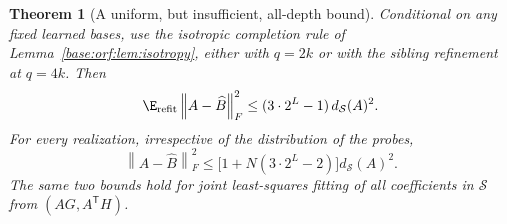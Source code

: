 \documentclass[11pt,oneside,openany,a4paper]{book}
\numberwithin{equation}{chapter}
\newtheorem{theorem}{Theorem}[chapter]
\theoremstyle{definition}
\theoremstyle{remark}
\newcommand{\T}{\mathsf T}\newcommand{\Id}{I}
\newcommand{\F}[1]{\left\lVert#1\right\rVert_F}
\begin{document}
\begin{theorem}[A uniform, but insufficient, all-depth bound]\label{base:orf:thm:bound}
Conditional on any fixed learned bases, use the isotropic completion rule
of Lemma~\ref{base:orf:lem:isotropy}, either with $q=2k$ or with the sibling refinement
at $q=4k$. Then
\begin{equation}\label{base:orf:eq:mainbound}
 \E_{\rm refit}\F{A-\widehat B}^2
 \le(3\cdot2^L-1)\,d_{\mathcal S}(A)^2.
\end{equation}
For every realization, irrespective of the distribution of the probes,
\begin{equation}\label{base:orf:eq:pathbound}
 \F{A-\widehat B}^2
 \le\bigl[1+N(3\cdot2^L-2)\bigr]d_{\mathcal S}(A)^2.
\end{equation}
The same two bounds hold for joint least-squares fitting of all coefficients
in $\mathcal S$ from $(AG,A^{\T}H)$.
\end{theorem}
\end{document}

